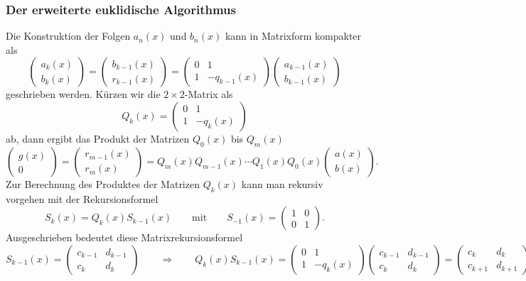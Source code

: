\subsubsection{Der erweiterte euklidische Algorithmus}
%
%
%
Die Konstruktion der Folgen $a_n(x)$ und $b_n(x)$ kann in Matrixform
kompakter als
\[
\begin{pmatrix}
a_k(x)\\
b_k(x)
\end{pmatrix}
=
\begin{pmatrix}
b_{k-1}(x)\\
r_{k-1}(x)
\end{pmatrix}
=
\begin{pmatrix}
0 & 1\\
1 & -q_{k-1}(x)
\end{pmatrix}
\begin{pmatrix}
a_{k-1}(x)\\
b_{k-1}(x)
\end{pmatrix}
\]
geschrieben werden.
Kürzen wir die $2\times 2$-Matrix als
\[
Q_k(x) = \begin{pmatrix} 0&1\\1&-q_k(x)\end{pmatrix}
\]
ab, dann ergibt das Produkt der Matrizen $Q_0(x)$ bis $Q_{m}(x)$
\[
\begin{pmatrix}
g(x)\\
0
\end{pmatrix}
=
\begin{pmatrix}
r_{m-1}(x)\\
r_{m}(x)
\end{pmatrix}
=
Q_{m}(x)
Q_{m-1}(x)
\cdots
Q_1(x)
Q_0(x)
\begin{pmatrix}
a(x)\\
b(x)
\end{pmatrix}.
\]
Zur Berechnung des Produktes der Matrizen $Q_k(x)$ kann man rekursiv
vorgehen mit der Rekursionsformel
\[
S_{k}(x) = Q_{k}(x) S_{k-1}(x)
\qquad\text{mit}\qquad
S_{-1}(x)
=
\begin{pmatrix} 1 & 0 \\ 0 & 1 \end{pmatrix}.
\]
Ausgeschrieben bedeutet diese Matrixrekursionsformel
\[
S_{k-1}(x)
=
\begin{pmatrix} 
c_{k-1} & d_{k-1} \\
c_k     & d_k
\end{pmatrix}
\qquad\Rightarrow\qquad
Q_{k}(x) S_{k-1}(x)
=
\begin{pmatrix}
0&1\\1&-q_k(x)
\end{pmatrix}
\begin{pmatrix} 
c_{k-1} & d_{k-1} \\
c_k     & d_k
\end{pmatrix}
=
\begin{pmatrix}
c_k&d_k\\
c_{k+1}&d_{k+1}
\end{pmatrix}.
\]
